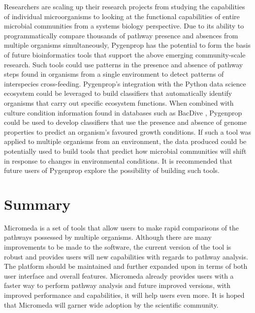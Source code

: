 Researchers are scaling up their research projects from studying the 
capabilities of individual microorganisms to looking at the functional 
capabilities of entire microbial communities from a systems biology perspective. 
Due to its ability to programmatically compare thousands of pathway presence and 
absences from multiple organisms simultaneously, Pygenprop has the potential to 
form the basis of future bioinformatics tools that support the above emerging 
community-scale research. Such tools could use patterns in the presence and 
absence of pathway steps found in organisms from a single environment to detect 
patterns of interspecies cross-feeding. Pygenprop's integration with the Python 
data science ecosystem could be leveraged to build classifiers that 
automatically identify organisms that carry out specific ecosystem functions. 
When combined with culture condition information found in databases such as 
BacDive \cite{reimer2018bac}, Pygenprop could be used to develop classifiers 
that use the presence and absence of genome properties to predict an organism's 
favoured growth conditions. If such a tool was applied to multiple organisms 
from an environment, the data produced could be potentially used to build tools 
that predict how microbial communities will shift in response to changes in 
environmental conditions. It is recommended that future users of Pygenprop 
explore the possibility of building such tools.

\section{Summary}

Micromeda is a set of tools that allow users to make rapid comparisons of the 
pathways possessed by multiple organisms. Although there are many improvements 
to be made to the software, the current version of the tool is robust and 
provides users will new capabilities with regards to pathway analysis. The 
platform should be maintained and further expanded upon in terms of both user 
interface and overall features. Micromeda already provides users with a faster 
way to perform pathway analysis and future improved versions, with improved 
performance and capabilities, it will help users even more. It is hoped that 
Micromeda will garner wide adoption by the scientific community.
